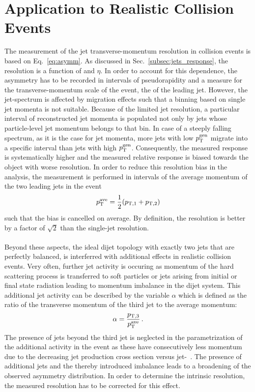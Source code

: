 \section{Application to Realistic Collision Events}
\label{sec:jer_application}
The measurement of the jet transverse-momentum resolution in collision events is based on Eq.~\ref{eq:asymm}. As discussed in Sec.~\ref{subsec:jets_response}, the resolution is a function of \pt and $\eta$. In order to account for this dependence, the asymmetry has to be recorded in intervals of pseudorapidity and a measure for the transverse-momentum scale of the event, \eg the \pt of the leading jet. However, the jet-\pt spectrum is affected by migration effects such that a binning based on single jet momenta is not suitable. Because of the limited jet resolution, a particular interval of reconstructed jet momenta is populated not only by jets whose particle-level jet momentum belongs to that bin. In case of a steeply falling spectrum, as it is the case for jet momenta, more jets with low $p_{\text{T}}^\mathrm{gen}$ migrate into a specific interval than jets with high $p_{\text{T}}^\mathrm{gen}$. Consequently, the measured response is systematically higher and the measured relative response is biased towards the object with worse resolution. In order to reduce this resolution bias in the analysis, the measurement is performed in intervals of the average momentum of the two leading jets in the event
\begin{equation}
p^{\text{ave}}_{\text{T}} = \frac{1}{2}(p_\mathrm{T,1} + p_\mathrm{T,2}) 
\end{equation}
such that the bias is cancelled on average. By definition, the \ptave resolution is better by a factor of $\sqrt{2}$ than the single-jet resolution.\\
\\
Beyond these aspects, the ideal dijet topology with exactly two jets that are perfectly balanced, is interferred with additional effects in realistic collision events. Very often, further jet activity is occuring as momentum of the hard scattering process is transferred to soft particles or jets arising from initial or final state radiation leading to momentum imbalance in the dijet system. This additional jet activity can be described by the variable $\alpha$ which is defined as the ratio of the transverse momentum of the third jet to the average momentum: 
 \begin{equation}
\label{eq:alpha}
\alpha = \frac{p_\mathrm{T,3}}{p_{\text{T}}^\mathrm{ave}} \, .
\end{equation}
The presence of jets beyond the third jet is neglected in the parametrization of the additional activity in the event as these have consecutively less momentum due to the decreasing jet production cross section versus jet-\pt~\cite{CMS-PAS-QCD-11-004}. The presence of additional jets and the thereby introduced imbalance leads to a broadening of the observed asymmetry distribution. In order to determine the intrinsic resolution, the measured resolution has to be corrected for this effect. \\
